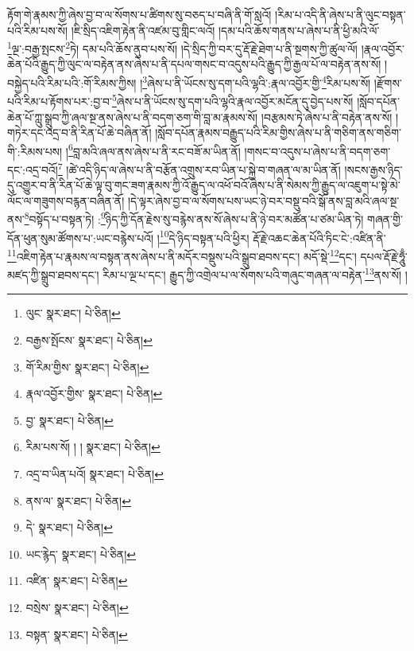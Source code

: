 རྟོག་གེ་རྣམས་ཀྱི་ཞེས་བྱ་བ་ལ་སོགས་པ་ཚིགས་སུ་བཅད་པ་བཞི་ནི་གོ་སླའོ། །རིམ་པ་འདི་ནི་ཞེས་པ་ནི་ལུང་བསྟན་པའི་རིམ་པས་སོ། །ཇི་སྲིད་འཇིག་རྟེན་ནི་འཛམ་བུ་གླིང་ལའོ། །དམ་པའི་ཆོས་གནས་པ་ཞེས་པ་ནི་ཕྱི་མའི་ལོ་\footnote{ལུང་  སྣར་ཐང་།  པེ་ཅིན། }ལྔ་:བརྒྱ་སྤངས་\footnote{བརྒྱས་སྤོངས་  སྣར་ཐང་།  པེ་ཅིན། }ཏེ། དམ་པའི་ཆོས་ནུབ་པས་སོ། །དེ་སྲིད་ཀྱི་བར་དུ་རྡོ་རྗེ་ཐེག་པ་ནི་སྔགས་ཀྱི་ཚུལ་ལོ། །རྣལ་འབྱོར་ཆེན་པོའི་རྒྱུད་ཀྱི་ལུང་ལ་བརྟེན་ནས་ཞེས་པ་ནི་དཔལ་གསང་བ་འདུས་པའི་རྒྱུད་ཀྱི་རྒྱལ་པོ་ལ་བརྟེན་ནས་སོ། །བསྐྱེད་པའི་རིམ་པའི་:གོ་རིམས་ཀྱིས། །\footnote{གོ་རིམ་གྱིས་  སྣར་ཐང་།  པེ་ཅིན། }ཞེས་པ་ནི་ཡོངས་སུ་དག་པའི་ལྷའི་:རྣལ་འབྱོར་གྱི་\footnote{རྣལ་འབྱོར་གྱིས་  སྣར་ཐང་།  པེ་ཅིན། }རིམ་པས་སོ། །རྫོགས་པའི་རིམ་པ་རྟོགས་པར་:བྱ་བ་\footnote{བྱ་  སྣར་ཐང་།  པེ་ཅིན། }ཞེས་པ་ནི་ཡོངས་སུ་དག་པའི་ལྷའི་རྣལ་འབྱོར་མངོན་དུ་བྱེད་པས་སོ། །སློབ་དཔོན་ཆེན་པོ་ཀླུ་སྒྲུབ་ཀྱི་ཞལ་སྔ་ནས་ཞེས་པ་ནི་བདག་ཅག་གི་བླ་མ་རྣམས་སོ། །བརྩམས་ཏེ་ཞེས་པ་ནི་བརྟེན་ནས་སོ། །གཏེར་དང་འདྲ་བ་ནི་རིན་པོ་ཆེ་བཞིན་ནོ། །སློབ་དཔོན་རྣམས་བརྒྱུད་པའི་རིམ་གྱིས་ཞེས་པ་ནི་གཅིག་ནས་གཅིག་གི་:རིམས་པས། །\footnote{རིམ་པས་སོ། ། །  སྣར་ཐང་།  པེ་ཅིན། }བླ་མའི་ཞལ་ནས་ཞེས་པ་ནི་རང་བཟོ་མ་ཡིན་ནོ། །གསང་བ་འདུས་པ་ཞེས་པ་ནི་བདག་ཅག་དང་:འདྲ་བའོ།\footnote{འདྲ་བ་ཡིན་པའོ།  སྣར་ཐང་།  པེ་ཅིན། } །ཚེ་འདི་ཉིད་ལ་ཞེས་པ་ནི་བརྩོན་འགྲུས་རབ་ཡིན་པ་སྐྱེ་བ་གཞན་ལ་མ་ཡིན་ནོ། །སངས་རྒྱས་ཉིད་དུ་འགྱུར་བ་ནི་རིན་པོ་ཆེ་ལྟ་བུ་གང་ཟག་རྣམས་ཀྱི་འོ་རྒྱུད་ལ་འཕོ་བའོ་ཞེས་པ་ནི་སེམས་ཀྱི་རྒྱུད་ལ་འཇུག་པ་སྟེ་མེ་ལོང་ལ་གཟུགས་བརྙན་བཞིན་ནོ། །དེ་ལྟར་ཞེས་བྱ་བ་ལ་སོགས་པས་ཡང་ཉེ་བར་བསྡུ་བའི་སྒོ་ནས་བླ་མའི་ཞལ་སྔ་ནས་\footnote{ནས་ལ་  སྣར་ཐང་།  པེ་ཅིན། }བསྟོད་པ་བསྟན་ཏེ། :\footnote{དེ་  སྣར་ཐང་།  པེ་ཅིན། }ཉིད་ཀྱི་དོན་རྗེས་སུ་བརྙེས་ནས་སོ་ཞེས་པ་ནི་ཉེ་བར་མཚོན་པ་ཙམ་ཡིན་ཏེ། གཞན་གྱི་དོན་ཕུན་སུམ་ཚོགས་པ་:ཡང་བརྙེས་པའོ། །\footnote{ཡང་རྙེད་  སྣར་ཐང་།  པེ་ཅིན། }དེ་ཉིད་བསྟན་པའི་ཕྱིར། རྡོ་རྗེ་འཆང་ཆེན་པོའི་ཏིང་ངེ་:འཛིན་ནི་\footnote{འཛིན་  སྣར་ཐང་།  པེ་ཅིན། }འཇིག་རྟེན་པ་རྣམས་ལ་བསྟན་ནས་ཞེས་པ་ནི་མདོར་བསྡུས་པའི་སྒྲུབ་ཐབས་དང་། མདོ་སྡེ་\footnote{བསྲེས་  སྣར་ཐང་།  པེ་ཅིན། }དང་། དཔལ་རྡོ་རྗེ་ཧཱུྃ་མཛད་ཀྱི་སྒྲུབ་ཐབས་དང་། རིམ་པ་ལྔ་པ་དང་། རྒྱུད་ཀྱི་འགྲེལ་པ་ལ་སོགས་པའི་གཞུང་གཞན་ལ་བརྟེན་\footnote{བསྟན་  སྣར་ཐང་།  པེ་ཅིན། }ནས་སོ། །
